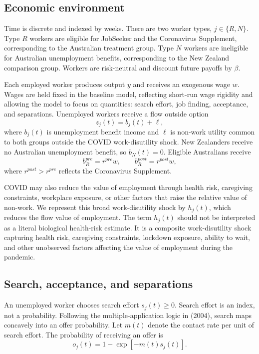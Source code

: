 \subsection{Economic environment}

Time is discrete and indexed by weeks. There are two worker types, $j \in \{R,N\}$. Type $R$ workers are eligible for JobSeeker and the Coronavirus Supplement, corresponding to the Australian treatment group. Type $N$ workers are ineligible for Australian unemployment benefits, corresponding to the New Zealand comparison group. Workers are risk-neutral and discount future payoffs by $\beta$.

Each employed worker produces output $y$ and receives an exogenous wage $w$. Wages are held fixed in the baseline model, reflecting short-run wage rigidity and allowing the model to focus on quantities: search effort, job finding, acceptance, and separations. Unemployed workers receive a flow outside option
\begin{equation}
    z_j(t) = b_j(t) + \ell ,
\end{equation}
where $b_j(t)$ is unemployment benefit income and $\ell$ is non-work utility common to both groups outside the COVID work-disutility shock. New Zealanders receive no Australian unemployment benefit, so $b_N(t)=0$. Eligible Australians receive
\begin{equation}
    b_R^{pre} = r^{pre} w, \qquad b_R^{post} = r^{post} w,
\end{equation}
where $r^{post}>r^{pre}$ reflects the Coronavirus Supplement.

COVID may also reduce the value of employment through health risk, caregiving constraints, workplace exposure, or other factors that raise the relative value of non-work. We represent this broad work-disutility shock by $h_j(t)$, which reduces the flow value of employment. The term $h_j(t)$ should not be interpreted as a literal biological health-risk estimate. It is a composite work-disutility shock capturing health risk, caregiving constraints, lockdown exposure, ability to wait, and other unobserved factors affecting the value of employment during the pandemic.

\subsection{Search, acceptance, and separations}

An unemployed worker chooses search effort $s_j(t) \geq 0$. Search effort is an index, not a probability. Following the multiple-application logic in \citeauthor{Shimer2004} (2004), search maps concavely into an offer probability. Let $m(t)$ denote the contact rate per unit of search effort. The probability of receiving an offer is
\begin{equation}
    o_j(t) = 1-\exp[-m(t)s_j(t)].
\end{equation}

